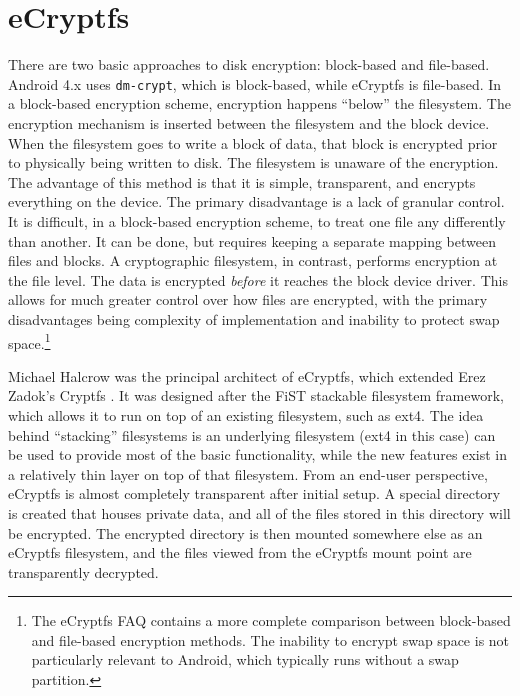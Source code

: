 \section{eCryptfs} 
\label{sec:ecryptfs}
There are two basic approaches to disk encryption: block-based and file-based. Android 4.x uses \texttt{dm-crypt}, which is
block-based, while eCryptfs is file-based.  In a block-based encryption scheme, encryption happens ``below'' the filesystem. The
encryption mechanism is inserted between the filesystem and the block device. When the filesystem goes to write a block of data,
that block is encrypted prior to physically being written to disk. The filesystem is unaware of the encryption. The advantage of
this method is that it is simple, transparent, and encrypts everything on the device. The primary disadvantage is a lack of granular
control. It is difficult, in a block-based encryption scheme, to treat one file any differently than another.  It can be done, but
requires keeping a separate mapping between files and blocks. A cryptographic filesystem, in contrast, performs encryption at the
file level. The data is encrypted \emph{before} it reaches the block device driver. This allows for much greater control over how
files are encrypted, with the primary disadvantages being complexity of implementation and inability to protect swap
space.\footnote{The eCryptfs FAQ contains a more complete comparison between block-based and file-based encryption methods. The
inability to encrypt swap space is not particularly relevant to Android, which typically runs without a swap partition.}

Michael Halcrow was the principal architect of eCryptfs, which extended Erez Zadok's Cryptfs \cite{Halcrow}. It was designed after
the FiST stackable filesystem framework, which allows it to run on top of an existing filesystem, such as ext4. The idea behind
``stacking'' filesystems is an underlying filesystem (ext4 in this case) can be used to provide most of the basic functionality,
while the new features exist in a relatively thin layer on top of that filesystem. From an end-user perspective, eCryptfs is almost
completely transparent after initial setup.  A special directory is created that houses private data, and all of the files stored in
this directory will be encrypted. The encrypted directory is then mounted somewhere else as an eCryptfs filesystem, and the files
viewed from the eCryptfs mount point are transparently decrypted. 

